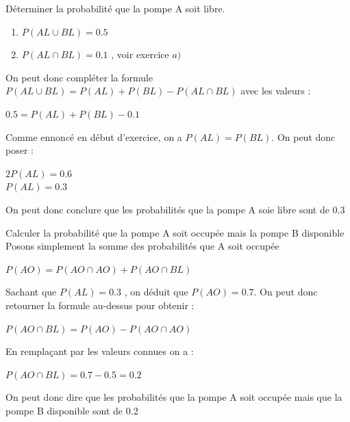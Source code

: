 \begin{exo}
\begin{subexo}{Déterminer la probabilité que la pompe A soit libre.}
		\begin{enumerate}
			\item[ ] $P(AL \cup BL) = 0.5$
			\item[ ] $P(AL \cap BL) = 0.1$ , voir exercice $a)$
		\end{enumerate}
		On peut donc compléter la formule $P(AL\cup BL) = P(AL) + P(BL) - P(AL \cap BL)$ avec les valeurs : 
		\begin{center}
			$0.5 = P(AL) + P(BL) - 0.1$
		\end{center}
		Comme ennoncé en début d'exercice, on a $P(AL) = P(BL)$. On peut donc poser :
		\begin{center}
			$2P(AL) = 0.6$ \\ $P(AL) = 0.3$
		\end{center}
		On peut donc conclure que les probabilités que la pompe A soie libre sont de 0.3
	\end{subexo}
	\begin{subexo}{Calculer la probabilité que la pompe A soit occupée mais la pompe B disponible}
		Posons simplement la somme des probabilités que A soit occupée 
		\begin{center}
			$P(AO) = P(AO \cap AO) + P(AO \cap BL)$
		\end{center}
		Sachant que $P(AL) = 0.3$ , on déduit que $P(AO) = 0.7$. On peut donc retourner la formule au-dessus pour obtenir :
		\begin{center}
			$P(AO \cap BL) = P(AO) - P(AO \cap AO)$
		\end{center}
	En remplaçant par les valeurs connues on a :
	\begin{center}
		$P(AO \cap BL) = 0.7 - 0.5 = 0.2$
	\end{center}
	On peut donc dire que les probabilités que la pompe A soit occupée mais que la pompe B disponible sont de $0.2$
	\end{subexo}
	\end{exo}
	
